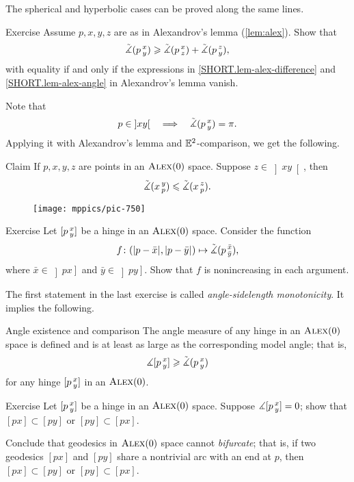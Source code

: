 The spherical and hyperbolic cases can be proved along the same lines.
\qeds

\begin{thm}[!]{Exercise}\label{ex:alex-lemma-cat}
Assume $p,x,y,z$ are as in Alexandrov's lemma (\ref{lem:alex}).
Show that
\[\tilde\measuredangle(p\,{}^{x}_{y})
\geqslant
\tilde\measuredangle(p\,{}^{x}_{z}) + \tilde\measuredangle(p\,{}^{z}_{y}),\]
with equality if and only if the expressions in \ref{SHORT.lem-alex-difference} and \ref{SHORT.lem-alex-angle} in Alexandrov's lemma vanish.
\end{thm}

Note that 
\[p\in\left]x y\right[
\quad\Longrightarrow\quad
\tilde\measuredangle(p\,{}^{x}_{y})=\pi.
\]
Applying it with Alexandrov's lemma and $\mathbb{E}^2$-comparison, we get the following.

\begin{thm}{Claim}\label{clm:angle-mono}
If $p,x,y,z$ are points in an $\textsc{Alex}(0)$ space.
Suppose $z\in\left]x y\right[$, then
\[\tilde\measuredangle(x\,{}^{y}_{p})\leqslant \tilde\measuredangle(x\,{}^{z}_{p}).\]
\end{thm}

\begin{wrapfigure}{r}{25mm}
\vskip-0mm
\centering
\texttt{[image: mppics/pic-750]}
\end{wrapfigure}

\begin{thm}[!]{Exercise}\label{ex:noncreasing}
Let $[p\,{}^{x}_{y}]$ be a hinge in an $\textsc{Alex}(0)$ space.
Consider the function
\[f\colon(|{p}-{\bar x}|_{}^{{}},|{p}-{\bar y}|_{}^{{}})\mapsto \tilde\measuredangle(p\,{}^{\bar x}_{\bar y}),\]
where $\bar x\in\left]p x\right]$ and $\bar y\in\left]p y\right]$.
Show that $f$ is nonincreasing in each argument.
\end{thm}

The first statement in the last exercise is called \emph{angle-sidelength monotonicity}.
It implies the following.

\begin{thm}{Angle existence and comparison}\label{clm:angle-defined}
The angle measure of any hinge in an $\textsc{Alex}(0)$ 
space is defined and  is at least as large as the corresponding model angle;
that is,
\[\measuredangle[p\,{}^{x}_{y}]\geqslant \tilde\measuredangle(p\,{}^{x}_{y})\]
for any hinge $[p\,{}^{x}_{y}]$ in an $\textsc{Alex}(0)$.

\end{thm}

\begin{thm}[!]{Exercise}\label{ex:0-angle}
Let $[p\,{}^{x}_{y}]$ be a hinge in an $\textsc{Alex}(0)$ space.
Suppose $\measuredangle[p\,{}^{x}_{y}]=0$; show that $[px]\subset [py]$ or $[py]\subset [px]$.

Conclude that geodesics in $\textsc{Alex}(0)$ space cannot \emph{bifurcate};
that is, if two geodesics $[px]$ and $[py]$ share a nontrivial arc with an end at $p$, then $[px]\subset [py]$ or $[py]\subset [px]$.
\end{thm}

